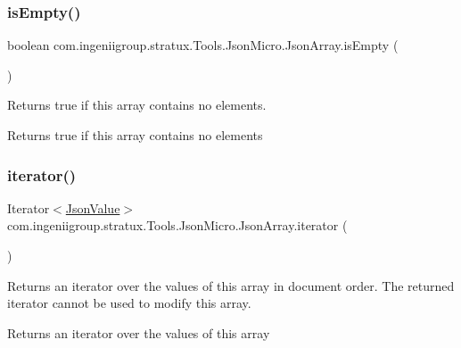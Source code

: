 \subsubsection{\texorpdfstring{is\+Empty()}{isEmpty()}}
{\footnotesize\ttfamily boolean com.\+ingeniigroup.\+stratux.\+Tools.\+Json\+Micro.\+Json\+Array.\+is\+Empty (\begin{DoxyParamCaption}{ }\end{DoxyParamCaption})}

Returns {\ttfamily true} if this array contains no elements.

\begin{DoxyReturn}{Returns}
{\ttfamily true} if this array contains no elements 
\end{DoxyReturn}
\mbox{\label{classcom_1_1ingeniigroup_1_1stratux_1_1_tools_1_1_json_micro_1_1_json_array_a424e080bf99ab9ad9bdc469974874fa8}} 
\subsubsection{\texorpdfstring{iterator()}{iterator()}}
{\footnotesize\ttfamily Iterator$<$\hyperlink{classcom_1_1ingeniigroup_1_1stratux_1_1_tools_1_1_json_micro_1_1_json_value}{Json\+Value}$>$ com.\+ingeniigroup.\+stratux.\+Tools.\+Json\+Micro.\+Json\+Array.\+iterator (\begin{DoxyParamCaption}{ }\end{DoxyParamCaption})}

Returns an iterator over the values of this array in document order. The returned iterator cannot be used to modify this array.

\begin{DoxyReturn}{Returns}
an iterator over the values of this array 
\end{DoxyReturn}
\mbox{\label{classcom_1_1ingeniigroup_1_1stratux_1_1_tools_1_1_json_micro_1_1_json_array_a152b53f97c4f43821c69f1a917b7c6db}} 
